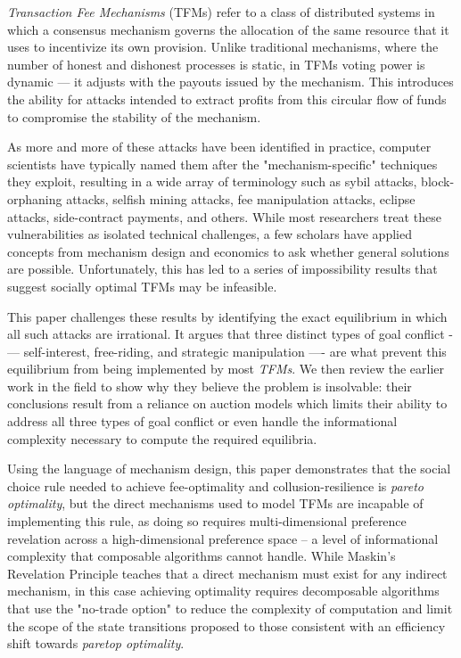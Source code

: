 
\emph{Transaction Fee Mechanisms} (TFMs) refer to a class of distributed systems in which a consensus mechanism governs the allocation of the same resource that it uses to incentivize its own provision. Unlike traditional mechanisms, where the number of honest and dishonest processes is static, in TFMs voting power is dynamic — it adjusts with the payouts issued by the mechanism. This introduces the ability for attacks intended to extract profits from this circular flow of funds to compromise the stability of the mechanism.

As more and more of these attacks have been identified in practice, computer scientists have typically named them after the "mechanism-specific" techniques they exploit, resulting in a wide array of terminology such as sybil attacks, block-orphaning attacks, selfish mining attacks, fee manipulation attacks, eclipse attacks, side-contract payments, and others. While most researchers treat these vulnerabilities as isolated technical challenges, a few scholars have applied concepts from mechanism design and economics to ask whether general solutions are possible. Unfortunately, this has led to a series of impossibility results that suggest socially optimal TFMs may be infeasible.

This paper challenges these results by identifying the exact equilibrium in which all such attacks are irrational. It argues that three distinct types of goal conflict -— self-interest, free-riding, and strategic manipulation —- are what prevent this equilibrium from being implemented by most \textit{TFMs}. We then review the earlier work in the field to show why they believe the problem is insolvable: their conclusions result from a reliance on auction models which limits their ability to address all three types of goal conflict or even handle the informational complexity necessary to compute the required equilibria.

Using the language of mechanism design, this paper demonstrates that the social choice rule needed to achieve fee-optimality and collusion-resilience is \textit{pareto optimality}, but the direct mechanisms used to model TFMs are incapable of implementing this rule, as doing so requires multi-dimensional preference revelation across a high-dimensional preference space -- a level of informational complexity that composable algorithms cannot handle. While Maskin's Revelation Principle teaches that a direct mechanism must exist for any indirect mechanism, in this case achieving optimality requires decomposable algorithms that use the "no-trade option" to reduce the complexity of computation and limit the scope of the state transitions proposed to those consistent with an efficiency shift towards \textit{paretop optimality}.


